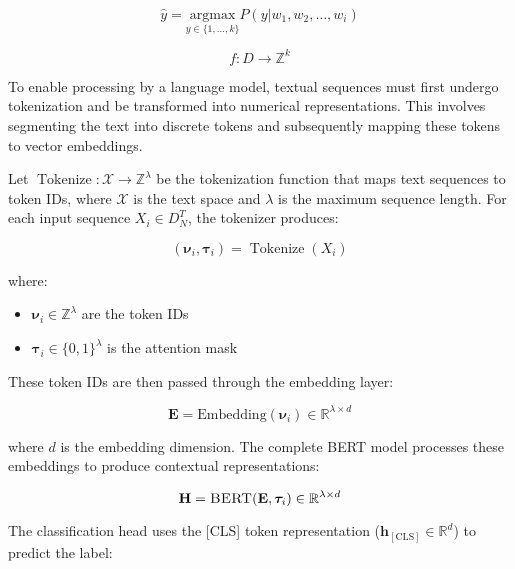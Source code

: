 \documentclass[runningheads]{llncs}
\DeclareMathOperator{\Tokenize}{Tokenize}
\newcommand{\bertmodel}{\textsc{BERT}}
\begin{document}
\begin{equation}
  \label{eq:classification-prob}
  \hat{y} = \underset{y\in\{1,\dots, k\}}{\text{argmax}}P(y|w_1,w_2,\dots, w_i)
\end{equation}


\begin{equation}\label{eq:clasificacion}
    f: D \longrightarrow \mathbb{Z}^k
\end{equation}

To enable processing by a language model, textual sequences must first
undergo tokenization and be transformed into numerical
representations. This involves segmenting the text into discrete
tokens and subsequently mapping these tokens to vector embeddings.

Let $\Tokenize: \mathcal{X} \rightarrow \mathbb{Z}^\lambda$ be the
tokenization function that maps text sequences to token IDs, where
$\mathcal{X}$ is the text space and $\lambda$ is the maximum sequence
length. For each input sequence $X_i \in D^T_N$, the tokenizer
produces:

\begin{equation}\label{eq:tokenization}
    (\boldsymbol{\nu}_i, \boldsymbol{\tau}_i) = \Tokenize(X_i)
\end{equation}

where:
\begin{itemize}
    \item $\boldsymbol{\nu}_i \in \mathbb{Z}^\lambda$ are the token IDs
    \item $\boldsymbol{\tau}_i \in \{0,1\}^\lambda$ is the attention mask
\end{itemize}

These token IDs are then passed through the embedding layer:

\begin{equation}\label{eq:embedding}
    \mathbf{E} = \text{Embedding}(\boldsymbol{\nu}_i) \in \mathbb{R}^{\lambda \times d}
\end{equation}

where $d$ is the embedding dimension. The complete \bertmodel{} model
processes these embeddings to produce contextual representations:

\begin{equation}\label{eq:encoding}
    \mathbf{H} = \bertmodel{}(\mathbf{E}, \boldsymbol{\tau}_i) \in \mathbb{R}^{\lambda \times d}
\end{equation}

The classification head uses the [CLS] token representation
($\mathbf{h}_{[\text{CLS}]} \in \mathbb{R}^d$) to predict the label:
\end{document}
